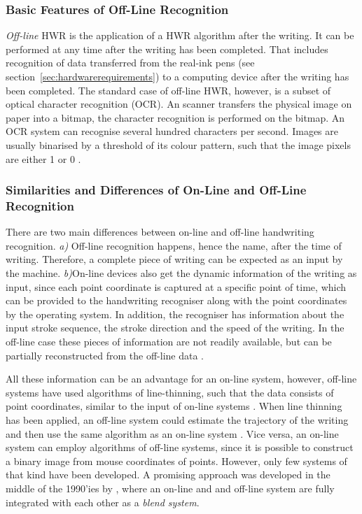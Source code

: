 \subsubsection{Basic Features of Off-Line Recognition}
\label{sec:basicfeaturesofofflinerecognition}

\emph{Off-line} HWR is the application of a HWR algorithm after the writing.
It can be performed at any time after the writing has been completed. That 
includes recognition of data transferred from the real-ink pens 
(see section~\ref{sec:hardwarerequirements}) to a computing device after the 
writing has been completed. The standard case of off-line HWR, however, is a 
subset of optical character recognition (OCR). An scanner transfers the physical 
image on paper into a bitmap, the character recognition is performed on the 
bitmap.
An OCR system can recognise several hundred characters per second. Images are
usually binarised by a threshold of its colour pattern, such that the image
pixels are either 1 or 0 .

\subsubsection[Similarities and Differences]{Similarities and Differences of On-Line and Off-Line  Recognition}
\label{sec:similaritiesanddifferences}

There are two main differences between on-line and off-line handwriting
recognition. \emph{a)} Off-line recognition happens, hence the name, 
after the time of writing. Therefore, a complete piece of writing can be 
expected as an input by the machine. \emph{b)}On-line devices also get the
dynamic information of the writing as input, since each point coordinate 
is captured at a specific point of time, which can be provided to the 
handwriting recogniser along with the point coordinates by the operating system.
In addition, the recogniser has information about the input stroke sequence, 
the stroke direction and the speed of the writing. In the off-line case these 
pieces of information are not readily available, but can be partially 
reconstructed from the off-line data .

All these information can be an advantage for an on-line system, however, 
off-line systems have used algorithms of line-thinning, such that the data 
consists of point coordinates, similar to the input of on-line systems 
. When line thinning has been applied, an off-line 
system could estimate the trajectory of the writing and then use the same 
algorithm as an on-line system . 
Vice versa, an on-line system can employ algorithms of off-line systems, 
since it is possible to construct a binary image from mouse coordinates 
of points. However, only few systems of that kind have been developed. 
A promising approach was developed in the middle of the 1990'ies by 
, where an on-line and and off-line system are 
fully integrated with each other as a \emph{blend system}.

